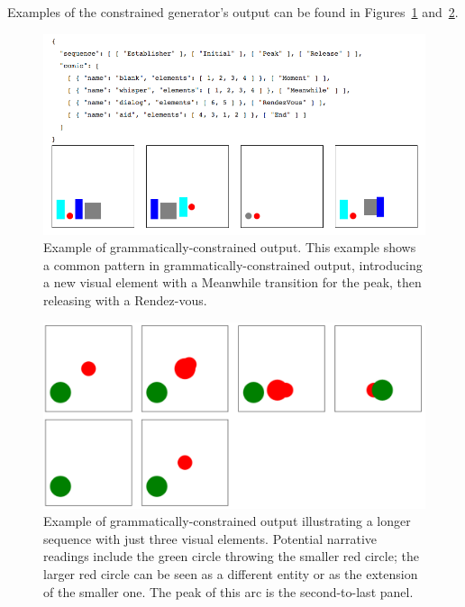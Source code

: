 Examples of the constrained generator's output can be found in
Figures~\ref{fig:outgood} and~\ref{fig:redgreen}.


\begin{figure}
\includegraphics[width=\columnwidth]{output-constrained-canonical.png}
\caption{Example of grammatically-constrained output.
This example shows a common pattern in grammatically-constrained output,
introducing a new visual element with a Meanwhile transition for the peak,
then releasing with a Rendez-vous.
}
\label{fig:outgood}
\end{figure}

\begin{figure}
\includegraphics[width=\columnwidth]{comicgen-output-4.png}
\caption{Example of grammatically-constrained output
illustrating a longer sequence with just three visual elements. Potential
narrative readings include the green circle throwing the smaller red
circle; the larger red circle can be seen as a different entity or as the
extension of the smaller one. The peak of this arc is the second-to-last
panel.
}
\label{fig:redgreen}
\end{figure}



